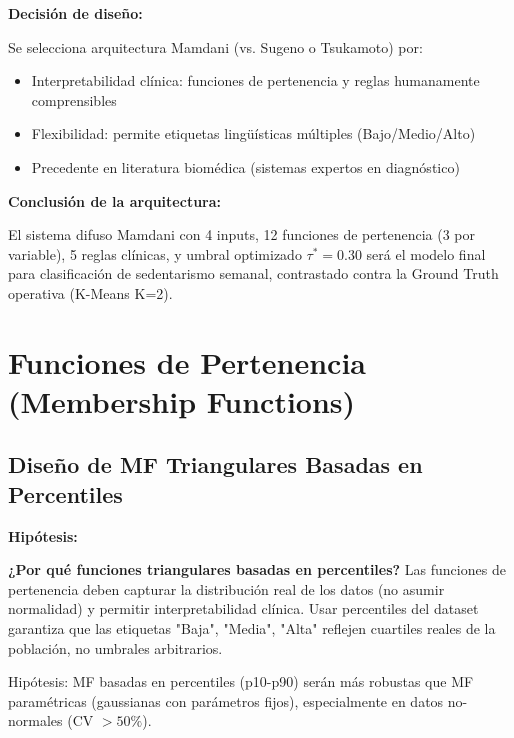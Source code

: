 \documentclass[12pt,letterpaper,twoside]{report}
\begin{document}
\begin{calculobox}
\begin{decisionbox}
\textbf{Decisión de diseño:}

Se selecciona arquitectura Mamdani (vs. Sugeno o Tsukamoto) por:
\begin{itemize}[noitemsep]
    \item Interpretabilidad clínica: funciones de pertenencia y reglas humanamente comprensibles
    \item Flexibilidad: permite etiquetas lingüísticas múltiples (Bajo/Medio/Alto)
    \item Precedente en literatura biomédica (sistemas expertos en diagnóstico)
\end{itemize}
\end{decisionbox}

\begin{conclusionbox}
\textbf{Conclusión de la arquitectura:}

El sistema difuso Mamdani con 4 inputs, 12 funciones de pertenencia (3 por variable), 5 reglas clínicas, y umbral optimizado $\tau^* = 0.30$ será el modelo final para clasificación de sedentarismo semanal, contrastado contra la Ground Truth operativa (K-Means K=2).
\end{conclusionbox}

\section{Funciones de Pertenencia (Membership Functions)}

\subsection{Diseño de MF Triangulares Basadas en Percentiles}

\begin{hipotesisbox}
\textbf{Hipótesis:}

\textbf{¿Por qué funciones triangulares basadas en percentiles?} Las funciones de pertenencia deben capturar la distribución real de los datos (no asumir normalidad) y permitir interpretabilidad clínica. Usar percentiles del dataset garantiza que las etiquetas "Baja", "Media", "Alta" reflejen cuartiles reales de la población, no umbrales arbitrarios.

Hipótesis: MF basadas en percentiles (p10-p90) serán más robustas que MF paramétricas (gaussianas con parámetros fijos), especialmente en datos no-normales (CV $> 50\%$).
\end{hipotesisbox}


\end{calculobox}
\end{document}
